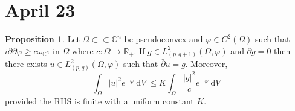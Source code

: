 \documentclass[12pt]{extarticle}
\newcommand{\R}{\mathbb{R}}
\newcommand{\C}{\mathbb{C}}
\renewcommand{\d}[1]{\: \mathrm{d}#1 \:}
\theoremstyle{definition}
\newtheorem{proposition}[theorem]{Proposition}
\begin{document}
\section{April 23}

\begin{proposition}
Let $\Omega \subset \subset \C^n$ be pseudoconvex and $\varphi \in C^2(\Omega)$ such that $i \partial \bar{\partial} \varphi \ge c \omega_{\C^n}$ in $\Omega$ where $c : \Omega \to \R_+$. If $g \in L^2_{(p, q+1)}(\Omega, \varphi)$ and $\bar{\partial} g = 0$ then there exists $u \in L^2_{(p,q)}(\Omega, \varphi)$ such that $\bar{\partial} u = g$. Moreover,
\[ \int_\Omega |u|^2 e^{-\varphi} \d{V} \le K \int_\Omega \frac{|g|^2}{c} e^{-\varphi} \d{V} \]
provided the RHS is finite with a uniform constant $K$.
\end{proposition}
\end{document}
